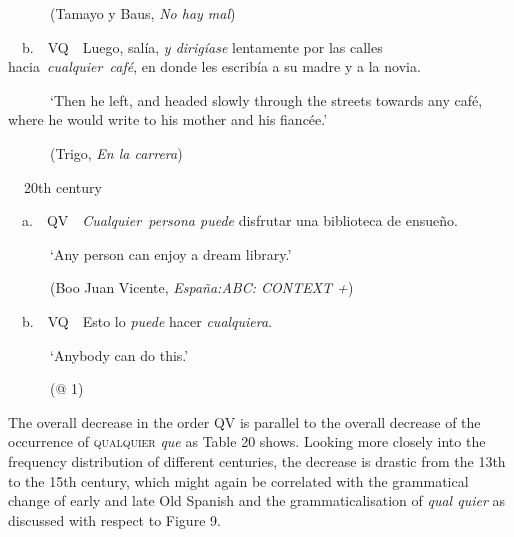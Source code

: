 \begin{styleStandard}
\ \ \ \ \ \ (Tamayo y Baus, \textit{No hay mal})
\end{styleStandard}

\begin{styleStandard}
\ \ b.\ \ VQ\ \ Luego, salía, \textit{y dirigíase} lentamente por las calles hacia\textit{~cualquier~café}, en donde les escribía a su madre y a la novia. 
\end{styleStandard}

\begin{styleStandard}
\ \ \ \ \ \ ‘Then he left, and headed slowly through the streets towards any café, where he would write to his mother and his fiancée.’
\end{styleStandard}

\begin{styleStandard}
\ \ \ \ \ \ (Trigo, \textit{En la carrera})
\end{styleStandard}

\begin{styleStandard}
\textbf{\ \ }20th century
\end{styleStandard}

\begin{styleStandard}
\ \ a.\ \ QV\ \ \textit{Cualquier~persona puede} disfrutar una biblioteca de ensueño.
\end{styleStandard}

\begin{styleStandard}
\ \ \ \ \ \ ‘Any person can enjoy a dream library.’
\end{styleStandard}

\begin{styleStandard}
\ \ \ \ \ \ (Boo Juan Vicente,\textit{ España:ABC: CONTEXT +})
\end{styleStandard}

\begin{styleStandard}
\ \ b.\ \ VQ\ \ Esto lo \textit{puede} hacer\textit{ cualquiera}. 
\end{styleStandard}

\begin{styleStandard}
\ \ \ \ \ \  ‘Anybody can do this.’
\end{styleStandard}

\begin{styleStandard}
\ \ \ \ \ \ (@ 1)
\end{styleStandard}

\begin{styleStandard}
The overall decrease in the order QV is parallel to the overall decrease of the occurrence of \textsc{qualquier} \textit{que} as Table 20 shows. Looking more closely into the frequency distribution of different centuries, the decrease is drastic from the 13th to the 15th century, which might again be correlated with the grammatical change of early and late Old Spanish and the grammaticalisation of \textit{qual quier} as discussed with respect to Figure 9.
\end{styleStandard}

